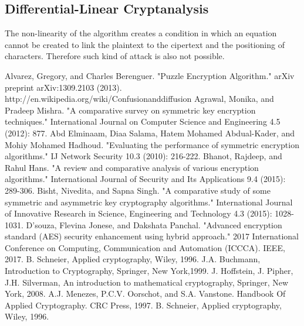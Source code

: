 \documentclass[letterpaper, 12 pt, conference]{ieeeconf}  %
\begin{document}
\subsection{Differential-Linear Cryptanalysis}
The non-linearity of the algorithm creates a condition in which an equation cannot be created to link the plaintext to the cipertext and the positioning of characters. Therefore such kind of attack is also not possible.
\newpage
\begin{thebibliography}{99}
	Alvarez, Gregory, and Charles Berenguer. "Puzzle Encryption Algorithm." arXiv preprint arXiv:1309.2103 (2013).
	http://en.wikipedia.org/wiki/Confusionanddiffusion
	Agrawal, Monika, and Pradeep Mishra. "A comparative survey on symmetric key encryption techniques." International Journal on Computer Science and Engineering 4.5 (2012): 877.
	Abd Elminaam, Diaa Salama, Hatem Mohamed Abdual-Kader, and Mohiy Mohamed Hadhoud. "Evaluating the performance of symmetric encryption algorithms." IJ Network Security 10.3 (2010): 216-222.
	Bhanot, Rajdeep, and Rahul Hans. "A review and comparative analysis of various encryption algorithms." International Journal of Security and Its Applications 9.4 (2015): 289-306.
	Bisht, Nivedita, and Sapna Singh. "A comparative study of some symmetric and asymmetric key cryptography algorithms." International Journal of Innovative Research in Science, Engineering and Technology 4.3 (2015): 1028-1031.
	D'souza, Flevina Jonese, and Dakshata Panchal. "Advanced encryption standard (AES) security enhancement using hybrid approach." 2017 International Conference on Computing, Communication and Automation (ICCCA). IEEE, 2017.
	B. Schneier, Applied cryptography, Wiley, 1996.
    J.A. Buchmann, Introduction to Cryptography, Springer, New York,1999.
    J. Hoffstein, J. Pipher, J.H. Silverman, An introduction to mathematical cryptography, Springer, New York, 2008.
    A.J. Menezes, P.C.V. Oorschot, and S.A. Vanstone. Handbook Of Applied Cryptography. CRC Press, 1997.
	B. Schneier, Applied cryptography, Wiley, 1996.
	
	
\end{thebibliography}
\end{document}
